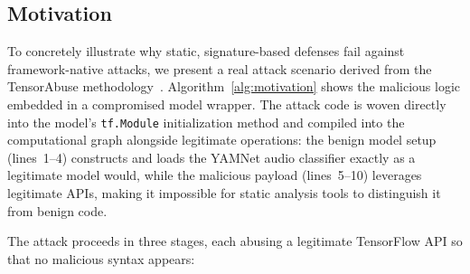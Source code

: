 \subsection{Motivation}
\label{sec:motivation}

To concretely illustrate why static, signature-based defenses fail against framework-native attacks, we present a real attack scenario derived from the TensorAbuse methodology~\cite{zhu2025}. Algorithm~\ref{alg:motivation} shows the malicious logic embedded in a compromised model wrapper. The attack code is woven directly into the model's \texttt{tf.Module} initialization method and compiled into the computational graph alongside legitimate operations: the benign model setup (lines~1--4) constructs and loads the YAMNet audio classifier exactly as a legitimate model would, while the malicious payload (lines~5--10) leverages legitimate APIs, making it impossible for static analysis tools to distinguish it from benign code.

\begin{algorithm}[t!]
\caption{Framework-Native File Exfiltration Attack}
\label{alg:motivation}


\end{algorithm}

The attack proceeds in three stages, each abusing a legitimate TensorFlow API so that no malicious syntax appears:

